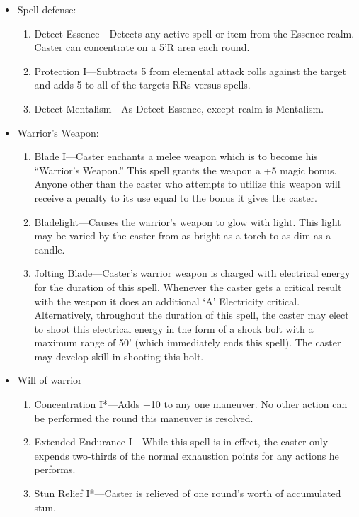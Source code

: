 \documentclass[oneside,12pt]{book}
\begin{document}
\begin{flushleft}
\begin{description}
{\begin{itemize}
\begin{enumerate}
\item Split Parry II*—Caster may divide his parry between
up to two melee attackers with no penalty.
\item Moving Strike I*—Caster may move up to 30\%
normal movement and attack without suffering a
penalty to his OB.
\end{enumerate}
\item Spell defense:
\begin{enumerate}
\scriptsize
\item Detect Essence—Detects any active spell or item from
the Essence realm. Caster can concentrate on a 5’R
area each round.
\item Protection I—Subtracts 5 from elemental attack rolls
against the target and adds 5 to all of the targets RRs
versus spells.
\item Detect Mentalism—As Detect Essence, except realm is
Mentalism.\end{enumerate}
\item Warrior's Weapon:
\begin{enumerate}
\scriptsize
\item Blade I—Caster enchants a melee weapon which is to
become his “Warrior’s Weapon.” This spell grants the
weapon a +5 magic bonus. Anyone other than the
caster who attempts to utilize this weapon will receive a
penalty to its use equal to the bonus it gives the caster.
\item Bladelight—Causes the warrior’s weapon to glow with
light. This light may be varied by the caster from as
bright as a torch to as dim as a candle.
\item Jolting Blade—Caster’s warrior weapon is charged with
electrical energy for the duration of this spell. Whenever
the caster gets a critical result with the weapon it does an
additional ‘A’ Electricity critical. Alternatively, throughout
the duration of this spell, the caster may elect to shoot
this electrical energy in the form of a shock bolt with a
maximum range of 50' (which immediately ends this
spell). The caster may develop skill in shooting this bolt.
\end{enumerate}
\item Will of warrior
\begin{enumerate}
\scriptsize
\item Concentration I*—Adds +10 to any one maneuver. No
other action can be performed the round this
maneuver is resolved.
\item Extended Endurance I—While this spell is in effect, the
caster only expends two-thirds of the normal
exhaustion points for any actions he performs.
\item Stun Relief I*—Caster is relieved of one round’s worth
of accumulated stun.\end{enumerate}
\end{itemize}
}
\end{description}
\clearpage

\end{flushleft}
\end{document}
